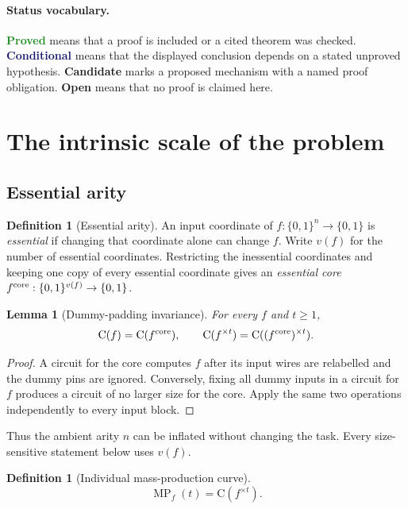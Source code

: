 \documentclass[11pt]{article}
\newtheorem{lemma}[theorem]{Lemma}
\theoremstyle{definition}
\newtheorem{definition}[theorem]{Definition}
\newcommand{\bits}{\{0,1\}}
\newcommand{\C}{\mathrm{C}}
\newcommand{\MP}{\operatorname{MP}}
\newcommand{\proved}{\textcolor{ForestGreen}{\textbf{Proved}}}
\newcommand{\conditional}{\textcolor{MidnightBlue}{\textbf{Conditional}}}
\newcommand{\candidate}{\textcolor{BurntOrange}{\textbf{Candidate}}}
\newcommand{\open}{\textcolor{BrickRed}{\textbf{Open}}}
\begin{document}
\paragraph{Status vocabulary.}
\proved{} means that a proof is included or a cited theorem was checked.
\conditional{} means that the displayed conclusion depends on a stated
unproved hypothesis.  \candidate{} marks a proposed mechanism with a named
proof obligation.  \open{} means that no proof is claimed here.

\section{The intrinsic scale of the problem}
\label{sec:intrinsic}

\subsection{Essential arity}

\begin{definition}[Essential arity]
An input coordinate of $f:\bits^n\to\bits$ is \emph{essential} if changing
that coordinate alone can change $f$.  Write $v(f)$ for the number of
essential coordinates.  Restricting the inessential coordinates and keeping
one copy of every essential coordinate gives an \emph{essential core}
$f^{\rm core}:\bits^{v(f)}\to\bits$.
\end{definition}

\begin{lemma}[Dummy-padding invariance]
\label{lem:dummy}
For every $f$ and $t\ge1$,
\[
  \C(f)=\C(f^{\rm core}),
  \qquad
  \C(f^{\times t})=\C((f^{\rm core})^{\times t}).
\]
\end{lemma}

\begin{proof}
A circuit for the core computes $f$ after its input wires are relabelled and
the dummy pins are ignored.  Conversely, fixing all dummy inputs in a circuit
for $f$ produces a circuit of no larger size for the core.  Apply the same
two operations independently to every input block.
\end{proof}

Thus the ambient arity $n$ can be inflated without changing the task.  Every
size-sensitive statement below uses $v(f)$.

\begin{definition}[Individual mass-production curve]
\[
  \MP_f(t)=\C(f^{\times t}).
\]
\end{definition}
\end{document}
